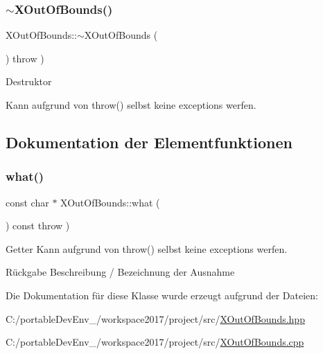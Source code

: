 \subsubsection{\texorpdfstring{$\sim$\+X\+Out\+Of\+Bounds()}{~XOutOfBounds()}}
{\footnotesize\ttfamily X\+Out\+Of\+Bounds\+::$\sim$\+X\+Out\+Of\+Bounds (\begin{DoxyParamCaption}{ }\end{DoxyParamCaption}) throw  ) \hspace{0.3cm}{\ttfamily [virtual]}}

Destruktor

Kann aufgrund von throw() selbst keine exceptions werfen. 

\subsection{Dokumentation der Elementfunktionen}
\mbox{\label{class_x_out_of_bounds_a5a047c4fa3db7ef57de7732ae4a2e937}} 
\subsubsection{\texorpdfstring{what()}{what()}}
{\footnotesize\ttfamily const char $\ast$ X\+Out\+Of\+Bounds\+::what (\begin{DoxyParamCaption}{ }\end{DoxyParamCaption}) const throw  ) }



Getter Kann aufgrund von throw() selbst keine exceptions werfen. 

\begin{DoxyReturn}{Rückgabe}
Beschreibung / Bezeichnung der Ausnahme 
\end{DoxyReturn}


Die Dokumentation für diese Klasse wurde erzeugt aufgrund der Dateien\+:\begin{DoxyCompactItemize}
\item 
C\+:/portable\+Dev\+Env\+\_/workspace2017/project/src/\hyperlink{_x_out_of_bounds_8hpp}{X\+Out\+Of\+Bounds.\+hpp}\item 
C\+:/portable\+Dev\+Env\+\_/workspace2017/project/src/\hyperlink{_x_out_of_bounds_8cpp}{X\+Out\+Of\+Bounds.\+cpp}\end{DoxyCompactItemize}
